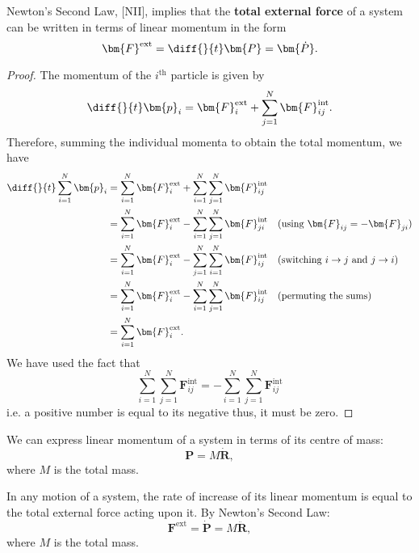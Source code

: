 \documentclass[12pt, a4paper]{article}
\begin{document}
\begin{theorem}
    Newton's Second Law, [NII], implies that the \textbf{total external force} of a system can be written in terms of linear momentum in the form
    \[\bm{F}^{\text{ext}}=\diff{}{t}\bm{P} = \bm{\dot{P}}.\]
\end{theorem}

\begin{proof}
    The momentum of the \(i^{\text{th}}\) particle is given by 
    \[\diff{}{t}\bm{p}_i = \bm{F}_{i}^{\text{ext}} + \sum_{j=1}^{N} \bm{F}_{ij}^{\text{int}}.\]
    Therefore, summing the individual momenta to obtain the total momentum, we have 
    \[\begin{aligned}
        \diff{}{t} \sum_{i=1}^{N} \bm{p}_i &= \sum_{i=1}^{N}\bm{F}_i^{\text{ext}} +\sum_{i=1}^{N} \sum_{j=1}^{N} \bm{F}_{ij}^{\text{int}} \\
        &= \sum_{i=1}^{N}\bm{F}_i^{\text{ext}} - \sum_{i=1}^{N} \sum_{j=1}^{N} \bm{F}_{ji}^{\text{int}} \quad \text{(using \(\bm{F}_{ij}=-\bm{F}_{ji}\))} \\
        &= \sum_{i=1}^{N}\bm{F}_i^{\text{ext}} - \sum_{j=1}^{N} \sum_{i=1}^{N} \bm{F}_{ij}^{\text{int}} \quad \text{(switching \(i \to j\) and \(j \to i\))}\\
        &=\sum_{i=1}^{N}\bm{F}_i^{\text{ext}} - \sum_{i=1}^{N} \sum_{j=1}^{N} \bm{F}_{ij}^{\text{int}} \quad \text{(permuting the sums)}\\
        &= \sum_{i=1}^{N}\bm{F}_i^{\text{ext}}.
    \end{aligned}\]
    We have used the fact that 
    \[\sum_{i=1}^{N} \sum_{j=1}^{N} \bm{F}_{ij}^{\text{int}} =- \sum_{i=1}^{N} \sum_{j=1}^{N} \bm{F}_{ij}^{\text{int}}\]
    i.e. a positive number is equal to its negative thus, it must be zero.
\end{proof}

\begin{theorem}
    We can express linear momentum of a system in terms of its centre of mass:
    \[\bm{P}=M \dot{\bm{R}},\]
    where \(M\) is the total mass.
\end{theorem}

\begin{mdthm}
    In any motion of a system, the rate of increase of its linear momentum is equal to the total external force acting upon it.
    By Newton's Second Law:
    \[\bm{F}^\text{ext}= \dot{\bm{P}} = M\ddot{\bm{R}},\]
    where \(M\) is the total mass.
\end{mdthm}
\end{document}
